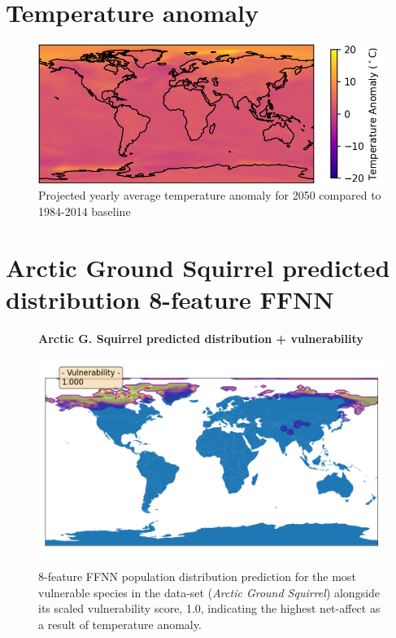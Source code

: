\section{Temperature anomaly} \label{appendix:temp-anomaly}

\begin{figure} [H]
    \centering
    \includegraphics[width=0.5\linewidth]{Images/temp_anomaly.png}
    \caption{Projected yearly average temperature anomaly for 2050 compared to 1984-2014 baseline}
\end{figure}



\section{Arctic Ground Squirrel predicted distribution 8-feature FFNN} \label{appendix:arcticsq}

\begin{figure} [H]
    \centering
\vspace*{-1ex}  
\begin{center}
\textbf{Arctic G. Squirrel predicted distribution + vulnerability}
\end{center}
\vspace*{0ex}
    \includegraphics[width=0.5\linewidth]{Images/arctic squirrel vulnerability.png}
    \caption{8-feature FFNN population distribution prediction for the most vulnerable species in the data-set (\emph{Arctic Ground Squirrel}) alongside its scaled vulnerability score, 1.0, indicating the highest net-affect as a result of temperature anomaly.}
    \label{fig:arcticsq}
\end{figure}
